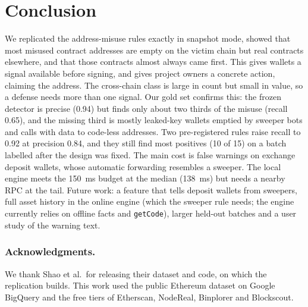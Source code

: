 \documentclass[runningheads]{llncs}
\begin{document}
\section{Conclusion}
\label{sec:conclusion}
We replicated the address-misuse rules exactly in snapshot mode, showed that
most misused contract addresses are empty on the victim chain but real contracts
elsewhere, and that those contracts almost always came first. This gives wallets
a signal available before signing, and gives project owners a concrete action,
claiming the address. The cross-chain class is large in count but small in value,
so a defense needs more than one signal. Our gold set confirms this: the
frozen detector is precise (0.94) but finds only about two thirds of the misuse
(recall 0.65), and the missing third is mostly leaked-key wallets emptied by
sweeper bots and calls with data to code-less addresses. Two pre-registered
rules raise recall to 0.92 at precision 0.84, and they still find most
positives (10 of 15) on a batch labelled after the design was fixed. The main
cost is false warnings on exchange deposit wallets, whose automatic forwarding
resembles a sweeper. The local engine meets the 150~ms budget at the median
(138~ms) but needs a nearby RPC at the tail. Future work: a feature that tells
deposit wallets from sweepers, full asset history in the online engine (which
the sweeper rule needs; the engine currently relies on offline facts and
\texttt{getCode}), larger held-out
batches and a user study of the warning text.

\subsubsection*{Acknowledgments.} We thank Shao et al.\ for releasing their dataset and code, on which the
replication builds. This work used the public Ethereum dataset on Google
BigQuery and the free tiers of Etherscan, NodeReal, Binplorer and Blockscout.
\end{document}
